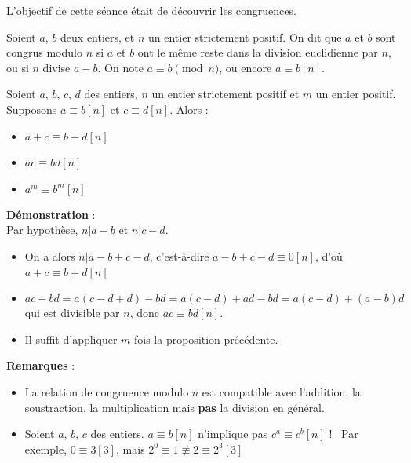 L'objectif de cette séance était de découvrir les congruences.

\smallskip

\begin{dfn}
Soient $a$, $b$ deux entiers, et $n$ un entier strictement positif. On dit que $a$ et $b$ sont congrus modulo $n$ si $a$ et $b$ ont le même reste dans la division euclidienne par $n$, ou si $n$ divise $a - b$.
On note $a \equiv b \pmod{n}$, ou encore $a \equiv b [n]$.
\end{dfn}
\smallskip


\begin{pro}
Soient $a$, $b$, $c$, $d$ des entiers, $n$ un entier strictement positif et $m$ un entier positif. Supposons $a \equiv b [n]$ et $c \equiv d [n]$. Alors :
\begin{itemize}
    \item $a + c \equiv b + d [n]$\
    \item $ac \equiv bd [n]$\
    \item $a^m\equiv b^m [n]$
\end{itemize}
\end{pro}
\smallskip

\textbf{Démonstration} :\\
Par hypothèse, $n|a-b$ et $n|c-d$.
\begin{itemize}
    \item On a alors $n|a-b+c-d$, c'est-à-dire $a-b+c-d\equiv 0[n]$, d'où $a+c\equiv b+d [n]$\
    \item $ac - bd = a(c - d + d) - bd = a(c - d) + ad - bd = a(c - d) + (a - b)d$ qui est divisible par $n$, donc $ac \equiv bd [n]$.\
    \item Il suffit d'appliquer $m$ fois la proposition précédente.\
\end{itemize}

\bigskip

\textbf{Remarques} :
\begin{itemize}
    \item La relation de congruence modulo $n$ est compatible avec l’addition, la soustraction, la multiplication mais \textbf{pas} la division en général.\
    \item Soient $a$, $b$, $c$ des entiers.
    \newline
    $a\equiv b[n]$ n'implique pas $c^a\equiv c^b[n]$ !\
    \newline
    Par exemple, $0\equiv 3[3]$, mais $2^0\equiv 1\not\equiv 2\equiv 2^3[3]$
\end{itemize}

